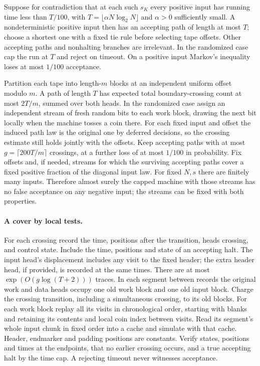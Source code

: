 \documentclass[11pt]{article}
\begin{document}
Suppose for contradiction that at each such $s_K$ every positive input has running time less than $T/100$, with $T=\lfloor\alpha N\log_2 N\rfloor$ and $\alpha>0$ sufficiently small. A nondeterministic positive input then has an accepting path of length at most $T$; choose a shortest one with a fixed tie rule before selecting tape offsets. Other accepting paths and nonhalting branches are irrelevant. In the randomized case cap the run at $T$ and reject on timeout. On a positive input Markov's inequality loses at most $1/100$ acceptance.

Partition each tape into length-$m$ blocks at an independent uniform offset modulo $m$. A path of length $T$ has expected total boundary-crossing count at most $2T/m$, summed over both heads. In the randomized case assign an independent stream of fresh random bits to each work block, drawing the next bit locally when the machine tosses a coin there. For each fixed input and offset the induced path law is the original one by deferred decisions, so the crossing estimate still holds jointly with the offsets. Keep accepting paths with at most $g=\lceil200T/m\rceil$ crossings, at a further loss of at most $1/100$ in probability. Fix offsets and, if needed, streams for which the surviving accepting paths cover a fixed positive fraction of the diagonal input law. For fixed $N,s$ there are finitely many inputs. Therefore almost surely the capped machine with those streams has no false acceptance on any negative input; the streams can be fixed with both properties.

\paragraph{A cover by local tests.}
For each crossing record the time, positions after the transition, heads crossing, and control state. Include the time, positions and state of an accepting halt. The input head's displacement includes any visit to the fixed header; the extra header head, if provided, is recorded at the same times. There are at most $\exp(O(g\log(T+2)))$ traces. In each segment between records the original work and data heads occupy one old work block and one old input block. Charge the crossing transition, including a simultaneous crossing, to its old blocks. For each work block replay all its visits in chronological order, starting with blanks and retaining its contents and local coin index between visits. Read its segment's whole input chunk in fixed order into a cache and simulate with that cache. Header, endmarker and padding positions are constants. Verify states, positions and times at the endpoints, that no earlier crossing occurs, and a true accepting halt by the time cap. A rejecting timeout never witnesses acceptance.
\end{document}
